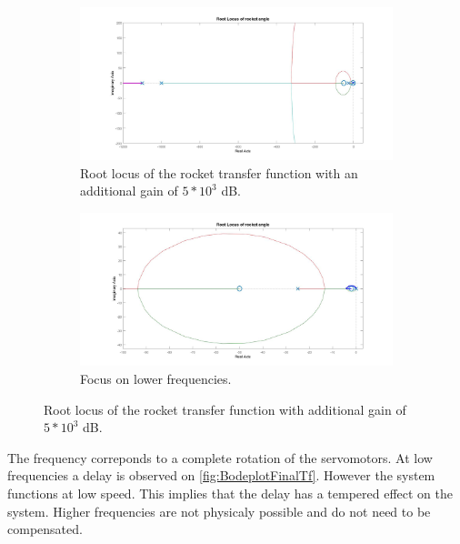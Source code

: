 \begin{figure}[htbp]
	\centering
	\begin{subfigure}{0.45\textwidth}
		\includegraphics[width=\textwidth]{figures/Rocket/design/tf_with_controller_5_vf}
		\caption{Root locus of the rocket transfer function with an additional gain of $5 * 10^3$ \si{\dB}.}
		\label{fig:FinalRocketTf}
	\end{subfigure}
	\begin{subfigure}{0.45\textwidth}
		\includegraphics[width=\textwidth]{figures/Rocket/design/tf_with_controller_5_zoom_vf}
		\caption{Focus on lower frequencies.}
		\label{fig:FinalRocketTfZoom}
	\end{subfigure}
	\caption{Root locus of the rocket transfer function with additional gain of $5*10^3$ \si{\dB}.}	
\end{figure}


The frequency correponds to a complete rotation of the servomotors. At low frequencies a delay is observed on \autoref{fig:BodeplotFinalTf}. However the system functions at low speed. This implies that the delay has a tempered effect on the system. Higher frequencies are not physicaly possible and do not need to be compensated.

